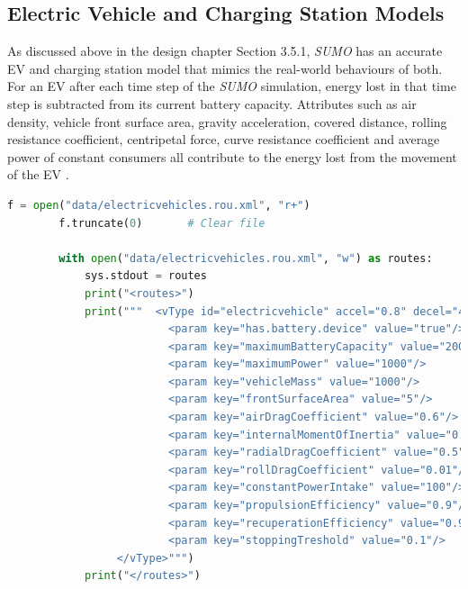 \documentclass[11pt]{report}
\begin{document}
\newpage

\subsection{Electric Vehicle and Charging Station Models}

As discussed above in the design chapter Section 3.5.1, \emph{SUMO} has an accurate EV and charging station model that mimics the real-world behaviours of both. For an EV after each time step of the \emph{SUMO} simulation, energy lost in that time step is subtracted from its current battery capacity. Attributes such as air density, vehicle front surface area, gravity acceleration, covered distance, rolling resistance coefficient, centripetal force, curve resistance coefficient and average power of constant consumers all contribute to the energy lost from the movement of the EV \autocite{kurczveil2013implementation}.

\begin{lstlisting}[language=Python, caption=Utility function to define EV model, label={lst:2}]
        f = open("data/electricvehicles.rou.xml", "r+")
        f.truncate(0)       # Clear file
    
        with open("data/electricvehicles.rou.xml", "w") as routes:
            sys.stdout = routes
            print("<routes>")
            print("""  <vType id="electricvehicle" accel="0.8" decel="4.5" sigma="0.5" emissionClass="Energy/unknown" minGap="2.5" maxSpeed="40" guiShape="evehicle" vClass="evehicle">
                         <param key="has.battery.device" value="true"/>
                         <param key="maximumBatteryCapacity" value="2000"/>
                         <param key="maximumPower" value="1000"/>
                         <param key="vehicleMass" value="1000"/>
                         <param key="frontSurfaceArea" value="5"/>
                         <param key="airDragCoefficient" value="0.6"/>
                         <param key="internalMomentOfInertia" value="0.01"/>
                         <param key="radialDragCoefficient" value="0.5"/>
                         <param key="rollDragCoefficient" value="0.01"/>
                         <param key="constantPowerIntake" value="100"/>
                         <param key="propulsionEfficiency" value="0.9"/>
                         <param key="recuperationEfficiency" value="0.9"/>
                         <param key="stoppingTreshold" value="0.1"/>
                 </vType>""")
            print("</routes>")
\end{lstlisting}
\end{document}
